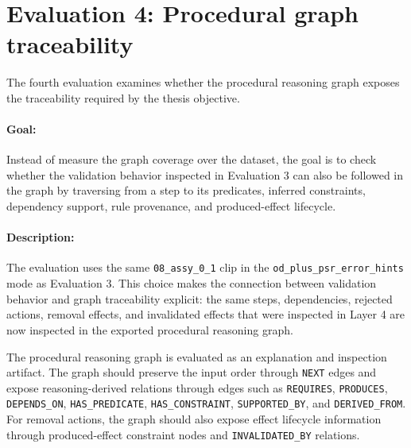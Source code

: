 \section{Evaluation 4: Procedural graph traceability}
\label{sec:evaluation-graph-traceability}

The fourth evaluation examines whether the procedural reasoning graph exposes the
traceability required by the thesis objective.

\paragraph{Goal:}
Instead of measure the graph coverage over the dataset, the goal is to check whether the validation behavior inspected in Evaluation 3 can also be followed in the graph by traversing from a step to its predicates, inferred constraints, dependency support, rule provenance, and produced-effect lifecycle.
 

\paragraph{Description:}
The evaluation uses the same \texttt{08\_assy\_0\_1} clip in the
\texttt{od\_plus\_psr\_error\_hints} mode as Evaluation 3. This choice makes the
connection between validation behavior and graph traceability explicit: the same
steps, dependencies, rejected actions, removal effects, and invalidated effects
that were inspected in Layer 4 are now inspected in the exported procedural
reasoning graph. 

The procedural reasoning graph is evaluated as an explanation and inspection
artifact. The graph should preserve the input order through \texttt{NEXT} edges
and expose reasoning-derived relations through edges such as \texttt{REQUIRES},
\texttt{PRODUCES}, \texttt{DEPENDS\_ON}, \texttt{HAS\_PREDICATE},
\texttt{HAS\_CONSTRAINT}, \texttt{SUPPORTED\_BY}, and \texttt{DERIVED\_FROM}.
For removal actions, the graph should also expose effect lifecycle information
through produced-effect constraint nodes and \texttt{INVALIDATED\_BY} relations.

